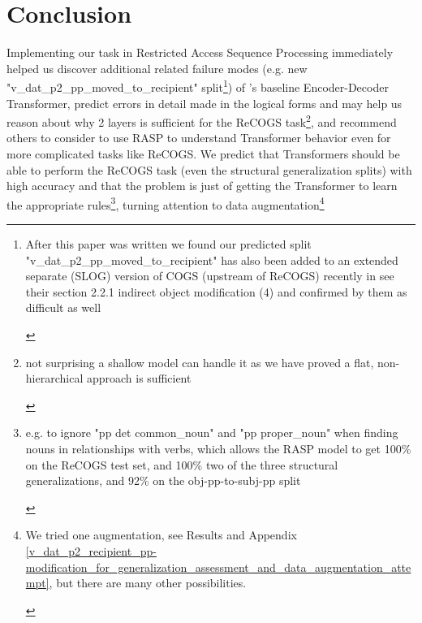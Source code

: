 \documentclass[11pt]{article}
\begin{document}
\section{Conclusion} 
Implementing our task in Restricted Access Sequence Processing immediately helped us discover additional related failure modes (e.g. new "v\_dat\_p2\_pp\_moved\_to\_recipient" split\footnote{\begin{footnotesize}After this paper was written we found our predicted split "v\_dat\_p2\_pp\_moved\_to\_recipient" has also been added to an extended separate (SLOG) version of COGS (upstream of ReCOGS) recently in \cite{li2023slogstructuralgeneralizationbenchmark} see their section 2.2.1 indirect object modification (4) and confirmed by them as difficult as well
\end{footnotesize}
}) of \cite{Wu2023}'s baseline Encoder-Decoder Transformer, predict errors in detail made in the logical forms and may help us reason about why 2 layers is sufficient for the ReCOGS task\footnote{\begin{footnotesize}not surprising a shallow model can handle it as we have proved a flat, non-hierarchical approach is sufficient\end{footnotesize}}, and recommend others to consider to use RASP to understand Transformer behavior even for more complicated tasks like ReCOGS. We predict that Transformers should be able to perform the ReCOGS task (even the structural generalization splits) with high accuracy and that the problem is just of getting the Transformer to learn the appropriate rules\footnote{\begin{footnotesize}e.g. to ignore "pp det common\_noun" and "pp proper\_noun" when finding nouns in relationships with verbs, which allows the RASP model to get 100\% on the ReCOGS test set, and 100\% two of the three structural generalizations, and 92\% on the obj-pp-to-subj-pp split\end{footnotesize}}, turning attention to data augmentation\footnote{\begin{footnotesize}We tried one augmentation, see Results and Appendix \ref{v_dat_p2_recipient_pp-modification_for_generalization_assessment_and_data_augmentation_attempt}, but there are many other possibilities.

\end{footnotesize}}
\end{document}
